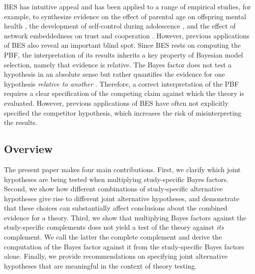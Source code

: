 \documentclass[letterpaper,11pt,oneside]{article}
\begin{document}
BES has intuitive appeal and has been applied to a range of empirical studies, for example, to synthesize evidence on the effect of parental age on offspring mental health \parencite{zondervan-zwijnenburgParentalAgeOffspring2020}, the development of self-control during adolescence \parencite{zondervan-zwijnenburgRobustLongitudinalMulticohort2020}, and the effect of network embeddedness on trust and cooperation \parencite{kevenaarBayesianEvidenceSynthesis2021, volkerFutureMadeToday2022}. However, previous applications of BES also reveal an important blind spot. Since BES rests on computing the PBF, the interpretation of its results inherits a key property of Bayesian model selection, namely that evidence is relative. The Bayes factor does not test a hypothesis in an absolute sense but rather quantifies the evidence for one hypothesis \textit{relative to another} \parencite{tendeiroReviewIssuesNull2019}. Therefore, a correct interpretation of the PBF requires a clear specification of the competing claim against which the theory is evaluated. However, previous applications of BES have often not explicitly specified the competitor hypothesis, which increases the risk of misinterpreting the results.


\subsection{Overview}

The present paper makes four main contributions. First, we clarify which joint hypotheses are being tested when multiplying study-specific Bayes factors. Second, we show how different combinations of study-specific alternative hypotheses give rise to different joint alternative hypotheses, and demonstrate that these choices can substantially affect conclusions about the combined evidence for a theory. Third, we show that multiplying Bayes factors against the study-specific complements does not yield a test of the theory against \textit{its} complement. We call the latter the complete complement and derive the computation of the Bayes factor against it from the study-specific Bayes factors alone. Finally, we provide recommendations on specifying joint alternative hypotheses that are meaningful in the context of theory testing.
\end{document}
